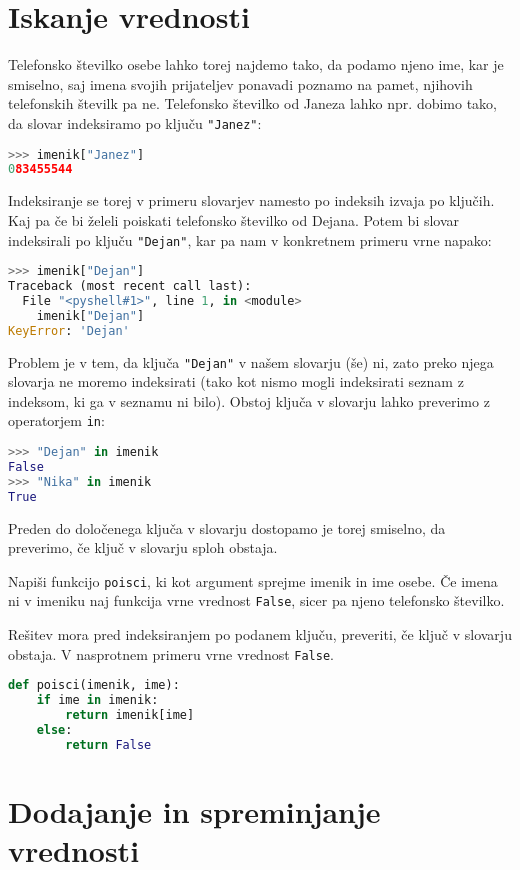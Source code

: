 \section{Iskanje vrednosti}
Telefonsko številko osebe lahko torej najdemo tako, da podamo njeno ime, kar je smiselno, saj imena svojih prijateljev ponavadi poznamo na pamet, njihovih telefonskih številk pa ne. Telefonsko številko od Janeza lahko npr. dobimo tako, da slovar indeksiramo po ključu \texttt{"Janez"}:
\begin{lstlisting}[language=Python]
>>> imenik["Janez"]
083455544
\end{lstlisting}
Indeksiranje se torej v primeru slovarjev namesto po indeksih izvaja po ključih. Kaj pa če bi želeli poiskati telefonsko številko od Dejana. Potem bi slovar indeksirali po ključu \texttt{"Dejan"}, kar pa nam v konkretnem primeru vrne napako:
\begin{lstlisting}[language=Python]
>>> imenik["Dejan"]
Traceback (most recent call last):
  File "<pyshell#1>", line 1, in <module>
    imenik["Dejan"]
KeyError: 'Dejan'
\end{lstlisting}
Problem je v tem, da ključa \texttt{"Dejan"} v našem slovarju (še) ni, zato preko njega slovarja ne moremo indeksirati (tako kot nismo mogli indeksirati seznam z indeksom, ki ga v seznamu ni bilo). Obstoj ključa v slovarju lahko preverimo z operatorjem \texttt{in}:
\begin{lstlisting}[language=Python]
>>> "Dejan" in imenik
False
>>> "Nika" in imenik
True
\end{lstlisting}
Preden do določenega ključa v slovarju dostopamo je torej smiselno, da preverimo, če ključ v slovarju sploh obstaja.
\begin{zgled}
Napiši funkcijo \texttt{poisci}, ki kot argument sprejme imenik in ime osebe. Če imena ni v imeniku naj funkcija vrne vrednost \texttt{False}, sicer pa njeno telefonsko številko.
\end{zgled}
\begin{resitev} Rešitev mora pred indeksiranjem po podanem ključu, preveriti, če ključ v slovarju obstaja. V nasprotnem primeru vrne vrednost \texttt{False}. 
\begin{lstlisting}[language=Python]
def poisci(imenik, ime):
    if ime in imenik:
        return imenik[ime]
    else:
        return False
\end{lstlisting}
\end{resitev}

\section{Dodajanje in spreminjanje vrednosti}

